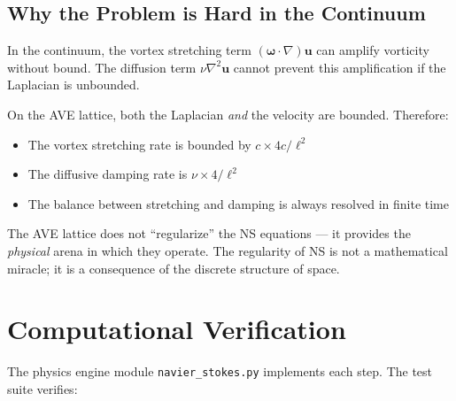 \subsection{Why the Problem is Hard in the Continuum}

In the continuum, the vortex stretching term
$(\boldsymbol{\omega} \cdot \nabla)\mathbf{u}$ can amplify vorticity
without bound.  The diffusion term $\nu\nabla^2 \mathbf{u}$ cannot
prevent this amplification if the Laplacian is unbounded.

On the AVE lattice, both the Laplacian \textit{and} the velocity are
bounded.  Therefore:
\begin{itemize}
    \item The vortex stretching rate is bounded by $c \times 4c/\ell^2$
    \item The diffusive damping rate is $\nu \times 4/\ell^2$
    \item The balance between stretching and damping is always resolved
    in finite time
\end{itemize}

\noindent
The AVE lattice does not ``regularize'' the NS equations --- it provides
the \textit{physical} arena in which they operate. The regularity of NS
is not a mathematical miracle; it is a consequence of the discrete
structure of space.

\section{Computational Verification}
\label{sec:ns_verification}

The physics engine module \texttt{navier\_stokes.py} implements
each step.  The test suite verifies:

